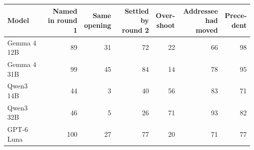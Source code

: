 \begin{tabular}{lrrrrrr}
\toprule
Model & \makecell{Named\\in round 1} & \makecell{Same\\opening} & \makecell{Settled\\by round 2} & \makecell{Over-\\shoot} & \makecell{Addressee\\had moved} & \makecell{Prece-\\dent} \\
\midrule
Gemma 4 12B & 89 & 31 & 72 & 22 & 66 & 98 \\
Gemma 4 31B & 99 & 45 & 84 & 14 & 78 & 95 \\
Qwen3 14B & 44 & 3 & 40 & 56 & 83 & 71 \\
Qwen3 32B & 46 & 5 & 26 & 71 & 93 & 82 \\
GPT-6 Luna & 100 & 27 & 77 & 20 & 71 & 77 \\
\bottomrule
\end{tabular}

